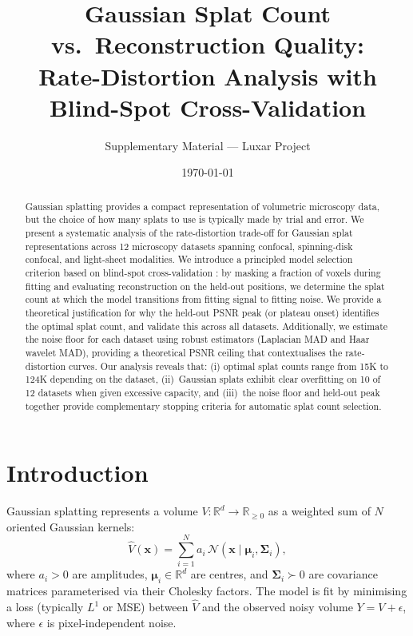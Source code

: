 \documentclass[11pt, a4paper]{article}
\title{\bfseries Gaussian Splat Count vs.\ Reconstruction Quality:\\
       Rate-Distortion Analysis with Blind-Spot Cross-Validation}
\author{Supplementary Material --- Luxar Project}
\date{\today}
\theoremstyle{plain}
\theoremstyle{definition}
\theoremstyle{remark}
\newcommand{\R}{\mathbb{R}}
\newcommand{\bx}{\bm{x}}
\newcommand{\Ncal}{\mathcal{N}}
\begin{document}
\maketitle

\begin{abstract}
Gaussian splatting provides a compact representation of volumetric
microscopy data, but the choice of how many splats to use is typically
made by trial and error. We present a systematic analysis of the
rate-distortion trade-off for Gaussian splat representations across
12 microscopy datasets spanning confocal, spinning-disk confocal, and
light-sheet modalities. We introduce a principled model selection criterion
based on blind-spot cross-validation
\citep{batson2019noise2self}: by masking a fraction of voxels during
fitting and evaluating reconstruction on the held-out positions, we
determine the splat count at which the model transitions from fitting
signal to fitting noise. We provide a theoretical justification for
why the held-out PSNR peak (or plateau onset) identifies the optimal
splat count, and validate this across all datasets. Additionally, we
estimate the noise floor for each dataset using robust estimators
(Laplacian MAD and Haar wavelet MAD), providing a theoretical PSNR
ceiling that contextualises the rate-distortion curves. Our analysis
reveals that: (i) optimal splat counts range from 15K to 124K depending
on the dataset, (ii)~Gaussian splats exhibit clear overfitting on 10 of
12 datasets when given excessive capacity, and (iii)~the noise floor
and held-out peak together provide complementary stopping criteria for
automatic splat count selection.
\end{abstract}

\tableofcontents

\section{Introduction}
\label{sec:intro}

Gaussian splatting \citep{kerbl20233dgs} represents a volume
$V:\R^d\to\R_{\ge 0}$ as a weighted sum of $N$ oriented Gaussian kernels:
\begin{equation}
  \hat{V}(\bx) = \sum_{i=1}^{N} a_i \,
  \Ncal\!\left(\bx \mid \bm{\mu}_i, \bm{\Sigma}_i\right),
  \label{eq:gsplat-model}
\end{equation}
where $a_i > 0$ are amplitudes, $\bm{\mu}_i\in\R^d$ are centres, and
$\bm{\Sigma}_i \succ 0$ are covariance matrices parameterised via their
Cholesky factors. The model is fit by minimising a loss (typically $L^1$
or MSE) between $\hat{V}$ and the observed noisy volume
$Y = V + \epsilon$, where $\epsilon$ is pixel-independent noise.
\end{document}
